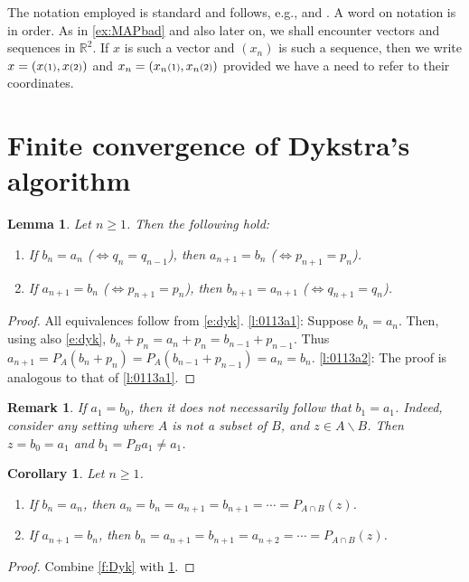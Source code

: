 \documentclass[12pt]{article}
\newcommand{\RR}{\ensuremath{\mathbb R}}
\newtheorem{lemma}[theorem]{Lemma}
\newtheorem{corollary}[theorem]{Corollary}
\newtheorem{remark}[theorem]{Remark}
\providecommand{\RR}{\mathbb{R}}
\providecommand{\RR}{\mathbb{R}}
\newcommand{\eins}{\ensuremath{\textstyle\mathsmaller{({1})}}}
\newcommand{\zwei}{\ensuremath{\textstyle\mathsmaller{({2})}}}
\begin{document}
The notation employed is standard and follows, e.g., \cite{BC2017}
and \cite{Deutsch}. 
A word on notation is in order. 
As in \cref{ex:MAPbad} and also later on, we shall encounter 
vectors and sequences in $\RR^2$. 
If $x$ is such a vector and $(x_n)$ is such a sequence, 
then we write $x=(x\eins,x\zwei)$ and 
$x_n = (x_n\eins,x_n\zwei)$ provided we have a need to refer to their coordinates. 


\section{Finite convergence of Dykstra's algorithm}

\label{s:finite}

\begin{lemma}
\label{l:0113a}
Let $n\geq 1$.
Then the following hold: 
\begin{enumerate}
\item 
\label{l:0113a1}
If $b_n=a_n$ 
($\Leftrightarrow q_n=q_{n-1}$), 
then 
$a_{n+1} = b_n$
($\Leftrightarrow p_{n+1}=p_n$).
\item 
\label{l:0113a2}
If $a_{n+1}=b_n$
($\Leftrightarrow p_{n+1}=p_n$),
then 
$b_{n+1} = a_{n+1}$
($\Leftrightarrow q_{n+1}=q_{n}$). 
\end{enumerate}
\end{lemma}
\begin{proof}
All equivalences follow from \eqref{e:dyk}. 
\ref{l:0113a1}:
Suppose $b_n=a_n$.
Then, using also \eqref{e:dyk},
$b_n+p_n = a_n+p_n = b_{n-1}+p_{n-1}$.
Thus 
$a_{n+1} = P_A(b_n+p_n) = P_A(b_{n-1}+p_{n-1}) = a_n=b_n$. 
\ref{l:0113a2}: 
The proof is analogous to that of \cref{l:0113a1}.
\end{proof}

\begin{remark}
If $a_1=b_0$, then it does not necessarily follow that 
$b_1=a_1$.
Indeed, consider any setting where $A$ is not a subset of $B$,
and $z\in A\smallsetminus B$. 
Then $z=b_0=a_1$ and $b_1=P_Ba_1\neq a_1$.
\end{remark}

\begin{corollary}
\label{c:0113a}
Let $n\geq 1$.
\begin{enumerate}
\item 
\label{c:0113a1}
If $b_n=a_n$, 
then $a_n=b_n=a_{n+1} = b_{n+1} = \cdots = P_{A\cap B}(z)$.
\item 
\label{c:0113a2}
If $a_{n+1}=b_n$, 
then $b_n=a_{n+1} = b_{n+1} = a_{n+2} = \cdots = P_{A\cap B}(z)$.
\end{enumerate}
\end{corollary}
\begin{proof}
Combine \cref{f:Dyk} with \cref{l:0113a}.
\end{proof}
\end{document}
